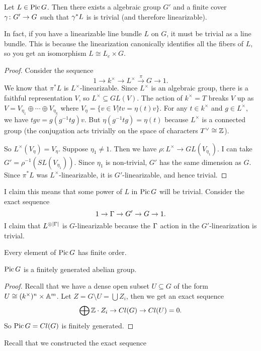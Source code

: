 \begin{lemma}
 Let $L\in \pic G$. Then there exists a algebraic group $G'$ and a finite cover $\ga\colon G'\to G$ such that $\ga^* L$ is is trivial (and therefore linearizable).
\end{lemma}
\begin{remark}
 In fact, if you have a linearizable line bundle $L$ on $G$, it must be trivial as a line bundle. This is because the linearization canonically identifies all the fibers of $L$, so you get an isomorphism $L\cong L_e\times G$.
\end{remark}
\begin{proof}
 Consider the sequence
 \[
  1\to k^\times\to L^\times\xrightarrow\pi G\to 1.
 \]
 We know that $\pi^*L$ is $L^\times$-linearizable. Since $L^\times$ is an algebraic group, there is a faithful representation $V$, so $L^\times\subseteq GL(V)$. The action of $k^\times=T$ breaks $V$ up as $V=V_{\eta_1}\oplus\cdots \oplus V_{\eta_k}$ where $V_\eta=\{v\in V| tv=\eta(t)v\}$. For any $t\in k^\times$ and $g\in L^\times$, we have $tgv=g(g^{-1}tg)v$. But $\eta(g^{-1}tg)=\eta(t)$ because $L^\times$ is a connected group (the conjugation acts trivially on the space of characters $T^\vee\cong \ZZ$).
 
 So $L^\times(V_\eta)=V_\eta$. Suppose $\eta_1\neq 1$. Then we have $\rho\colon L^\times\to GL(V_{\eta_1})$. I can take $G'=\rho^{-1}(SL(V_{\eta_1}))$. Since $\eta_1$ is non-trivial, $G'$ has the same dimension as $G$. Since $\pi^*L$ was $L^\times$-linearizable, it is $G'$-linearizable, and hence trivial.
\end{proof}
I claim this means that some power of $L$ in $\pic G$ will be trivial. Consider the exact sequence
\[
 1\to \Ga\to G'\to G\to 1.
\]
I claim that $L^{\otimes |\Ga|}$ is $G$-linearizable because the $\Ga$ action in the $G'$-linearization is trivial.
\begin{corollary}
 Every element of $\pic G$ has finite order.
\end{corollary}
\begin{lemma}
 $\pic G$ is a finitely generated abelian group.
\end{lemma}
\begin{proof}
 Recall that we have a dense open subset $U\subseteq G$ of the form $U\cong (k^\times)^n\times \AA^m$. Let $Z=G\setminus U=\bigcup Z_i$, then we get an exact sequence
 \[
  \bigoplus \ZZ\cdot Z_i \to Cl(G)\to Cl(U)=0.
 \]
 So $\pic G=Cl(G)$ is finitely generated.
\end{proof}
Recall that we constructed the exact sequence
